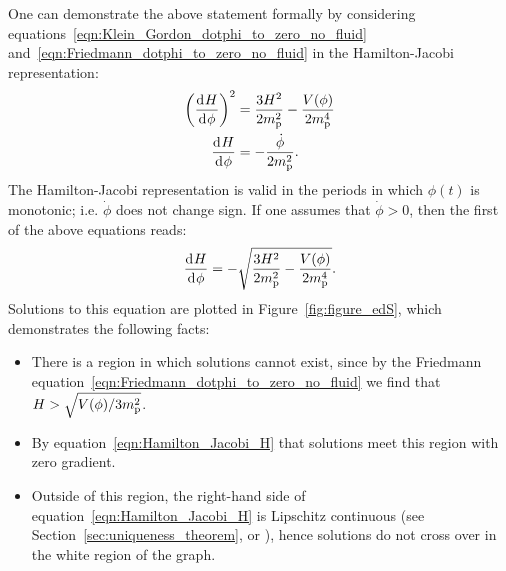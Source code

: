 One can demonstrate the above statement formally by considering equations~\eqref{eqn:Klein_Gordon_dotphi_to_zero_no_fluid} and~\eqref{eqn:Friedmann_dotphi_to_zero_no_fluid} in the Hamilton-Jacobi representation:
%
\begin{align}
  {\left(\frac{\operatorname{d}^{}\!{H}}{\operatorname{d}^{}\!{\phi}}\right)}^2
  &=
  \frac{3H^2}{2m_{\mathrm{p}}^2} - \frac{V(\phi)}{2m_{\mathrm{p}}^4}
  \\
  \frac{\operatorname{d}^{}\!{H}}{\operatorname{d}^{}\!{\phi}}
  &=
  -\frac{\dot{\phi}}{2m_{\mathrm{p}}^2}.
\end{align}
%
The Hamilton-Jacobi representation is valid in the periods in which $\phi(t)$ is monotonic; i.e. $\dot{\phi}$ does not change sign. If one assumes that $\dot{\phi}>0$, then the first of the above equations reads:
%
\begin{equation}
  \frac{\operatorname{d}^{}\!{H}}{\operatorname{d}^{}\!{\phi}} 
  = 
  -\sqrt{\frac{3H^2}{2m_{\mathrm{p}}^2} - \frac{V(\phi)}{2m_{\mathrm{p}}^4}}.
  \label{eqn:Hamilton_Jacobi_H}
\end{equation}
%
Solutions to this equation are plotted in Figure~\ref{fig:figure_edS}, which demonstrates the following facts: 
%
\begin{itemize}
  \item There is a region in which solutions cannot exist, since by the Friedmann equation~\eqref{eqn:Friedmann_dotphi_to_zero_no_fluid} we find that $H>\sqrt{V(\phi)/3m_{\mathrm{p}}^2}$.
  \item  By equation~\eqref{eqn:Hamilton_Jacobi_H} that solutions meet this region with zero gradient.
  \item Outside of this region, the right-hand side of equation~\eqref{eqn:Hamilton_Jacobi_H} is Lipschitz continuous (see Section~\ref{sec:uniqueness_theorem}, or \citet{agarwal_1993}), hence solutions do not cross over in the white region of the graph.
\end{itemize}
% 

